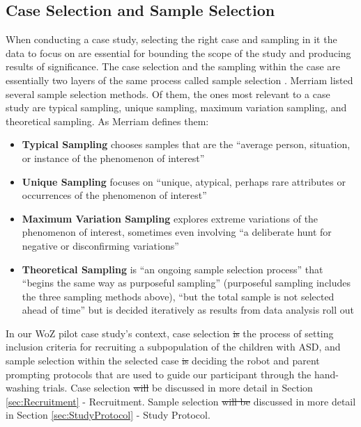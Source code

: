 \documentclass{ut-thesis}
\providecommand{\DIFaddtex}[1]{{\protect\color{blue}\uwave{#1}}} %
\providecommand{\DIFdeltex}[1]{{\protect\color{red}\sout{#1}}}                      %
\providecommand{\DIFaddbegin}{} %
\providecommand{\DIFaddend}{} %
\providecommand{\DIFdelbegin}{} %
\providecommand{\DIFdelend}{} %
\providecommand{\DIFadd}[1]{\texorpdfstring{\DIFaddtex{#1}}{#1}} %
\providecommand{\DIFdel}[1]{\texorpdfstring{\DIFdeltex{#1}}{}} %
\begin{document}
\subsection{Case Selection and Sample Selection}
\label{sec:CaseSelectionAndSampleSelection}
When conducting a case study, selecting the right case and sampling in it the data to focus on are essential for bounding the scope of the study and producing results of significance.  The case selection and the sampling within the case are essentially two layers of the same process called sample selection \cite{merriam2014qualitative}.  Merriam \cite{merriam2014qualitative} listed several sample selection methods.  Of them, the ones most relevant to a case study are typical sampling, unique sampling, maximum variation sampling, and theoretical sampling. As Merriam defines them:
\begin{itemize}
	\item \textbf{Typical Sampling} chooses samples that are the ``average person, situation, or instance of the phenomenon of interest''
	\item \textbf{Unique Sampling} focuses on ``unique, atypical, perhaps rare attributes or occurrences of the phenomenon of interest''
	\item \textbf{Maximum Variation Sampling} explores extreme variations of the phenomenon of interest, sometimes even involving ``a deliberate hunt for negative or disconfirming variations''
	\item \textbf{Theoretical Sampling}  is ``an ongoing sample selection process'' that ``begins the same way as purposeful sampling'' (purposeful sampling includes the three sampling methods above), ``but the total sample is not selected ahead of time'' but is decided iteratively as results from data analysis roll out
\end{itemize}

In our WoZ pilot case study's context, case selection \DIFdelbegin \DIFdel{is }\DIFdelend \DIFaddbegin \DIFadd{was }\DIFaddend the process of setting inclusion criteria for recruiting a subpopulation of the children with ASD, and sample selection within the selected case \DIFdelbegin \DIFdel{is }\DIFdelend \DIFaddbegin \DIFadd{was }\DIFaddend deciding the robot and parent prompting protocols that are used to guide our participant through the hand-washing trials.  Case selection \DIFdelbegin \DIFdel{will }\DIFdelend \DIFaddbegin \DIFadd{is }\DIFaddend be discussed in more detail in Section \ref{sec:Recruitment} - Recruitment.  Sample selection \DIFdelbegin \DIFdel{will be }\DIFdelend \DIFaddbegin \DIFadd{is }\DIFaddend discussed in more detail in Section \ref{sec:StudyProtocol} - Study Protocol.
\end{document}
